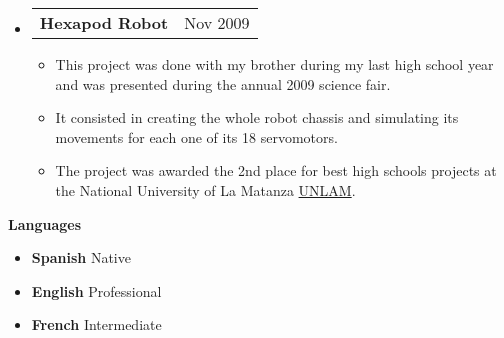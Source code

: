 \documentclass[letterpaper,12pt]{article}[leftmargin=*]
\makeatletter
\def \entryspacing {-0pt}
\renewcommand{\section}[2]{\vspace{5pt}
  \colorbox{secondary}{\color{white}\raggedbottom\normalsize\textbf{{#1}{\hspace{7pt}#2}}}
}
\newcommand{\resumeEntryStart}{\begin{itemize}[leftmargin=2.5mm]}
\newcommand{\resumeEntryEnd}{\end{itemize}\vspace{\entryspacing}}
\newcommand{\resumeItemListStart}{\begin{itemize}[leftmargin=4.5mm]}
\newcommand{\resumeItemListEnd}{\end{itemize}}
\newcommand{\resumeItem}[1]{
  \item\small{
    {#1 \vspace{-2pt}}
  }
}
\newcommand{\resumeEntryTD}[2]{
  \vspace{-1pt}\item[]
    \begin{tabularx}{0.97\textwidth}{X@{\hspace{60pt}}r}
      \textbf{\color{primary}#1} & {\firabook\color{accent}\small#2} \\
    \end{tabularx}\vspace{-6pt}
}
\newcommand{\resumeEntryS}[2]{
  \item[]\small{
    \textbf{\color{primary}#1 }{ #2 \vspace{-6pt}}
  }
}
\makeatother
\begin{document}
  
  
\resumeEntryStart
   \resumeEntryTD
      {Hexapod Robot \href{https://mattborghi.github.io/projects/Hexapod\%20Robot/}{\faGithub}}{Nov 2009}
    \resumeItemListStart
      \resumeItem {This project was done with my brother during my last high school year and was presented during the annual 2009 science fair.}
      \resumeItem {It consisted in creating the whole robot chassis and simulating its movements for each one of its 18 servomotors.}
      \resumeItem {The project was awarded the 2nd place for best high schools projects at the National University of La Matanza \href{https://www.unlam.edu.ar/}{UNLAM}. }
  \resumeItemListEnd
  \resumeEntryEnd
  



\section{\faBook}{Languages}
 \resumeEntryStart
    \resumeEntryS {Spanish}{Native} 
    \resumeEntryS {English}{Professional}
    \resumeEntryS {French}{Intermediate}
 \resumeEntryEnd
\end{document}
